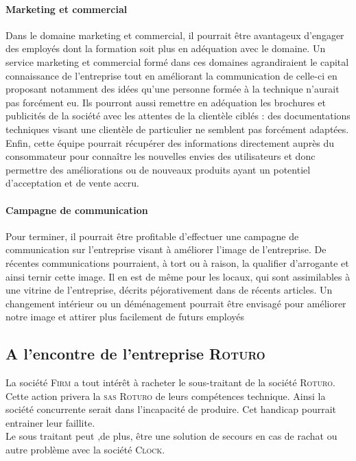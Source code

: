\paragraph{Marketing et commercial}
Dans le domaine marketing et commercial, il pourrait être avantageux d'engager des employés dont la formation soit plus en adéquation avec le domaine. Un service marketing et commercial formé dans ces domaines agrandiraient le capital connaissance de l'entreprise tout en améliorant la communication de celle-ci en proposant notamment des idées qu'une personne formée à la technique n'aurait pas forcément eu. Ils pourront aussi remettre en adéquation les brochures et publicités de la société avec les attentes de la clientèle ciblés : des documentations techniques visant une clientèle de particulier ne semblent pas forcément adaptées. Enfin, cette équipe pourrait récupérer des informations directement auprès du consommateur pour connaître les nouvelles envies des utilisateurs et donc permettre des améliorations ou de nouveaux produits ayant un potentiel d'acceptation et de vente accru.
\paragraph{Campagne de communication}
Pour terminer, il pourrait être profitable d'effectuer une campagne de communication sur l'entreprise visant à améliorer l'image de l'entreprise. De récentes communications pourraient, à tort ou à raison, la qualifier d'arrogante et ainsi ternir cette image. Il en est de même pour les locaux, qui sont assimilables à une vitrine de l'entreprise, décrits péjorativement dans de récents articles. Un changement intérieur ou un déménagement pourrait être envisagé pour améliorer notre image et attirer plus facilement de futurs employés
\subsection{A l'encontre de l'entreprise \textsc{Roturo}}
La société \textsc{Firm} a tout intérêt à racheter le sous-traitant de la société \textsc{Roturo}. Cette action privera la \textsc{sas Roturo} de leurs compétences technique. Ainsi la société concurrente  serait dans l'incapacité de produire. Cet handicap pourrait entrainer leur faillite.\\
Le sous traitant peut ,de plus, être une solution de secours en cas de rachat ou autre problème avec la société \textsc{Clock}.
